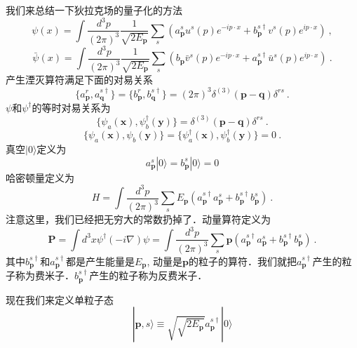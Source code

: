 
我们来总结一下狄拉克场的量子化的方法
\begin{equation}
\psi(x) = \int \frac{d^3 p}{(2\pi)^3} \frac{1}{\sqrt{2 E_{\mathbf p}}} \sum_s (a_{\mathbf p}^s u^s (p) e^{-ip\cdot x} + b_{\mathbf p}^{s\dagger} v^s(p) e^{ip\cdot x})~,
\end{equation}
\begin{equation}
\bar \psi (x) = \int \frac{d^3 p}{(2\pi)^3} \frac{1}{\sqrt{2 E_{\mathbf p}}} \sum_s (b_{\mathbf p}\bar v ^s(p) e^{- i p\cdot x}+ a_{\mathbf p}^{s\dagger} \bar u^s(p)e^{i p \cdot x})~.
\end{equation}
产生湮灭算符满足下面的对易关系
\begin{equation}
\{a_{\mathbf p}^r,a_{\mathbf q}^{s\dagger}\} = \{b_{\mathbf p}^r,b_{\mathbf q}^{s\dagger}\} = (2\pi)^3\delta^{(3)}(\mathbf p - \mathbf q)\delta^{rs}~.
\end{equation}
$\psi$和$\psi^\dagger$的等时对易关系为
\begin{equation}
\{\psi_a(\mathbf x),\psi_b^\dagger(\mathbf y)\} = \delta^{(3)}(\mathbf p - \mathbf q)\delta^{rs}~.
\end{equation}
\begin{equation}
\{\psi_a(\mathbf x),\psi_b(\mathbf y)\} = \{\psi_a^\dagger(\mathbf x),\psi_b^\dagger(\mathbf y)\} = 0 ~.
\end{equation}
真空$|0\rangle$定义为
\begin{equation}
a_{\mathbf p }^s|0\rangle = b_{\mathbf p}^s|0\rangle = 0
\end{equation}
哈密顿量定义为
\begin{equation}
H = \int \frac{d^3p}{(2\pi)^3}\sum_s E_{\mathbf p} (a^{s\dagger}_{\mathbf p}a^{s}_{\mathbf p}+b^{s\dagger}_{\mathbf p}b_{\mathbf p}^s)~.
\end{equation}
注意这里，我们已经把无穷大的常数扔掉了．动量算符定义为
\begin{equation}
\mathbf P = \int d^3 x \psi^\dagger (-i\nabla)\psi = \int \frac{d^3 p}{(2\pi)^3} \sum_s \mathbf p (a_{\mathbf p}^{s\dagger} a_{\mathbf p}^s+b_{\mathbf p}^{s\dagger}b_{\mathbf p}^s)~.
\end{equation}
其中$b_{\mathbf p}^{s\dagger}$和$a_{\mathbf p}^{s\dagger}$都是产生能量是$E_{\mathbf p}$, 动量是$\mathbf p$的粒子的算符．我们就把$a_{\mathbf p}^{s\dagger}$产生的粒子称为费米子．$b_{\mathbf p}^{s\dagger}$产生的粒子称为反费米子．

现在我们来定义单粒子态
\begin{equation}
|\mathbf p,s\rangle \equiv \sqrt{\sqrt{2 E_{\mathbf p}}} a_{\mathbf p}^{s\dagger} | 0 \rangle 
\end{equation}
















